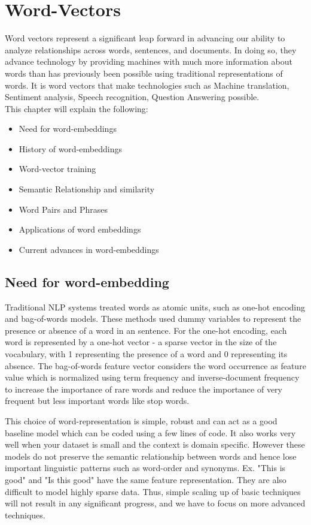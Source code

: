 \newpage
\chapter{Word-Vectors}

Word vectors represent a significant leap forward in advancing our ability to analyze relationships across words, sentences, and documents. In doing so, they advance technology by providing machines with much more information about words than has previously been possible using traditional representations of words. It is word vectors that make technologies such as Machine translation, Sentiment analysis, Speech recognition, Question Answering possible.\\

\noindent This chapter will explain the following:
\begin{itemize}
\item{Need for word-embeddings}
\item{History of word-embeddings}
\item{Word-vector training}
\item{Semantic Relationship and similarity}
\item{Word Pairs and Phrases}
\item{Applications of word embeddings}
\item{Current advances in word-embeddings}
\end{itemize}

\section{Need for word-embedding}

Traditional NLP systems treated words as atomic units, such as one-hot encoding and bag-of-words models. These methods used dummy variables to represent the presence or absence of a word in an sentence. For the one-hot encoding, each word is represented by a one-hot vector - a sparse vector in the size of the vocabulary, with 1 representing the presence of a word and 0 representing its absence. The bag-of-words feature vector considers the word occurrence as feature value which is normalized using term frequency and inverse-document frequency to increase the importance of rare words and reduce the importance of very frequent but less important words like stop words.

This choice of word-representation is simple, robust and can act as a good baseline model which can be coded using a few lines of code. It also works very well when your dataset is small and the context is domain specific. However these models do not preserve the semantic relationship between words and hence lose important linguistic patterns such as word-order and synonyms. Ex. "This is good" and "Is this good" have the same feature representation. They are also difficult to model highly sparse data. Thus, simple scaling up of basic techniques will not result in any significant progress, and we have to focus on more advanced techniques.

